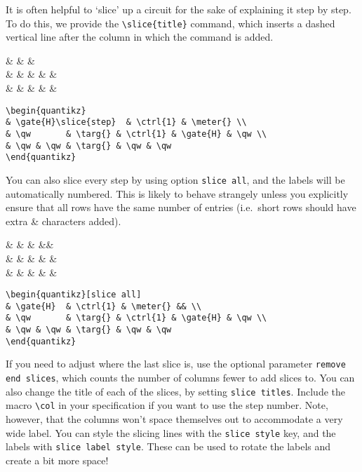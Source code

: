 \documentclass[aps,pra,10pt,nofootinbib]{revtex4}
\begin{document}
It is often helpful to `slice' up a circuit for the sake of explaining it step by step. To do this, we provide the \verb!\slice{title}! command, which inserts a dashed vertical line after the column in which the command is added.
\begin{Code}
\begin{center}
\begin{quantikz}
&   &  & \meter{} \\
& \qw       & \targ{} &  &  & \qw \\
& \qw & \qw & \targ{} & \qw & \qw
\end{quantikz}
\end{center}
\tcblower
\begin{lstlisting}
\begin{quantikz}
& \gate{H}\slice{step}  & \ctrl{1} & \meter{} \\
& \qw       & \targ{} & \ctrl{1} & \gate{H} & \qw \\
& \qw & \qw & \targ{} & \qw & \qw
\end{quantikz}
\end{lstlisting}
\end{Code}
You can also slice every step by using option \verb!slice all!, and the labels will be automatically numbered. This is likely to behave strangely unless you explicitly ensure that all rows have the same number of entries (i.e.\ short rows should have extra \& characters added).
\begin{Code}
\begin{center}
\begin{quantikz}
&  &  & \meter{} && \\
& \qw       & \targ{} &  &  & \qw \\
& \qw & \qw & \targ{} & \qw & \qw
\end{quantikz}
\end{center}
\tcblower
\begin{lstlisting}
\begin{quantikz}[slice all]
& \gate{H}  & \ctrl{1} & \meter{} && \\
& \qw       & \targ{} & \ctrl{1} & \gate{H} & \qw \\
& \qw & \qw & \targ{} & \qw & \qw
\end{quantikz}
\end{lstlisting}
\end{Code}
If you need to adjust where the last slice is, use the optional parameter \verb!remove end slices!, which counts the number of columns fewer to add slices to. You can also change the title of each of the slices, by setting \verb!slice titles!. Include the macro \verb!\col! in your specification if you want to use the step number. Note, however, that the columns won't space themselves out to accommodate a very wide label. You can style the slicing lines with the \verb!slice style! key, and the labels with \verb!slice label style!. These can be used to rotate the labels and create a bit more space!
\end{document}
